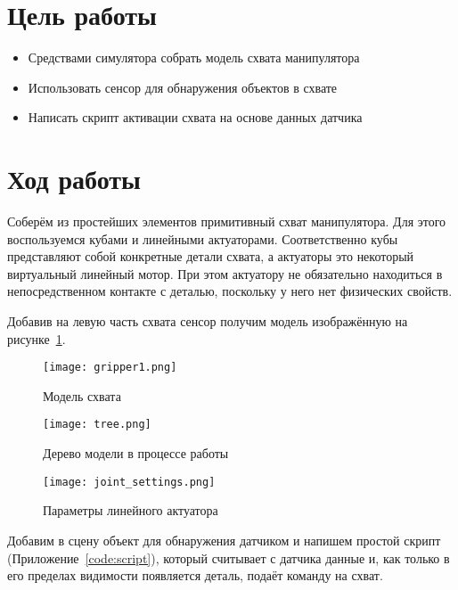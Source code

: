 \documentclass[14pt]{extarticle}
\begin{document}
    

    \section*{Цель работы}
    \begin{itemize}
        \item Средствами симулятора собрать модель схвата манипулятора
        \item Использовать сенсор для обнаружения объектов в схвате
        \item Написать скрипт активации схвата на основе данных датчика
    \end{itemize}

    \section*{Ход работы}

    Соберём из простейших элементов примитивный схват манипулятора. Для этого воспользуемся кубами и линейными
    актуаторами. Соответственно кубы представляют собой конкретные детали схвата, а актуаторы это некоторый виртуальный
    линейный мотор. При этом актуатору не обязательно находиться в непосредственном контакте с деталью, поскольку у него
    нет физических свойств.

    Добавив на левую часть схвата сенсор получим модель изображённую на рисунке~\ref{pic:wip gripper}.

    \begin{figure}[H]
        \centering
        \texttt{[image: gripper1.png]}
        \caption{Модель схвата}
        \label{pic:wip gripper}
    \end{figure}

    \begin{figure}[H]
        \centering
        \texttt{[image: tree.png]}
        \caption{Дерево модели в процессе работы}
        \label{pic:wip tree}
    \end{figure}

    \begin{figure}[H]
        \centering
        \texttt{[image: joint\_settings.png]}
        \caption{Параметры линейного актуатора}
        \label{pic:joint settings}
    \end{figure}

    Добавим в сцену объект для обнаружения датчиком и напишем простой скрипт (Приложение~\ref{code:script}), который
    считывает с датчика данные и, как только в его пределах видимости появляется деталь, подаёт команду на схват.
\end{document}
